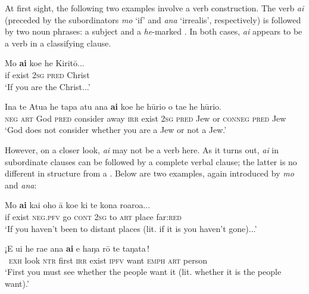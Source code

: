 At first sight, the following two examples involve a  verb construction. The verb \textit{ai} (preceded by the subordinators \textit{mo} ‘if’ and \textit{ana} ‘irrealis’, respectively) is followed by two noun phrases: a subject and a \textit{he}-marked . In both cases, \textit{ai} appears to be a  verb in a classifying clause.

\ea\label{ex:9.97}
\gll Mo \textbf{ai} koe he Kiritō... \\
if exist \textsc{2sg} \textsc{pred} Christ \\

\glt 
‘If you are the Christ...’ \textstyleExampleref{[Mat. 26:63]}
\z

\ea\label{ex:9.98}
\gll {\ꞌ}Ina te {\ꞌ}Atua he tapa atu ana \textbf{ai} koe he hūrio {\ꞌ}o ta{\ꞌ}e he hūrio. \\
\textsc{neg} \textsc{art} God \textsc{pred} consider away \textsc{irr} exist \textsc{2sg} \textsc{pred} Jew or \textsc{conneg} \textsc{pred} Jew \\

\glt
‘God does not consider whether you are a Jew or not a Jew.’ 
\z

However, on a closer look, \textit{ai} may not be a  verb here. As it turns out, \textit{ai} in subordinate clauses can be followed by a complete verbal clause; the latter is no different in structure from a . Below are two examples, again introduced by \textit{mo} and \textit{ana}:

\ea\label{ex:9.99}
\gll Mo \textbf{ai} {\ob}kai oho {\ꞌ}ā koe ki te kona roaroa...\,{\cb} \\
if exist {\db}\textsc{neg.pfv} go \textsc{cont} \textsc{2sg} to \textsc{art} place far:\textsc{red} \\

\glt 
‘If you haven’t been to distant places (lit. if it is you haven’t gone)...’ \textstyleExampleref{[R615.519]} 
\z

\ea\label{ex:9.100}
\gll ¡E u{\ꞌ}i he ra{\ꞌ}e ana \textbf{ai} {\ob}e haŋa rō te taŋata\,{\cb}! \\
~\textsc{exh} look \textsc{ntr} first \textsc{irr} exist {\db}\textsc{ipfv} want \textsc{emph} \textsc{art} person \\

\glt
‘First you must see whether the people want it (lit. whether it is the people want).’ \textstyleExampleref{[R647.248]} 
\z

